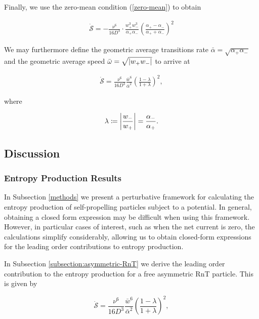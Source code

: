 Finally, we use the zero-mean condition (\ref{zero-mean}) to obtain 

\begin{align}\label{RnT-ent}
\dot{\mathcal{S}}=-\frac{\nu^6}{16D^3}\cdot\frac{w_+^3w_-^3}{\alpha_+\alpha_-}\left(\frac{\alpha_+-\alpha_-}{\alpha_+ + \alpha_-}\right)^2
\end{align}

We may furthermore define the geometric average transitions rate $\bar{\alpha}= \sqrt{\alpha_+\alpha_-}$ and the geometric average speed $\bar{\omega} = \sqrt{\abs{w_+w_-}}$ to arrive at 

\begin{align}
  \dot{\mathcal{S}} = \frac{\nu^6}{16D^3}\frac{\bar{w}^6}{\bar{\alpha}^2}\left(\frac{1-\lambda}{1+\lambda}\right)^2,
\end{align}

where 

\begin{equation}
  \lambda \coloneqq \abs{\frac{w_-}{w_+}} = \frac{\alpha_-}{\alpha_+}.
\end{equation}

\subsection{Discussion}
\subsubsection{Entropy Production Results}

In Subsection \ref{methods} we present a perturbative framework for calculating the entropy production of self-propelling particles subject to a potential. In general, obtaining a closed form expression may be difficult when using this framework. However, in particular cases of interest, such as when the net current is zero, the calculations simplify considerably, allowing us to obtain closed-form expressions for the leading order contributions to entropy production.

In Subsection \ref{subsection:asymmetric-RnT} we derive the leading order contribution to the entropy production for a free asymmetric RnT particle. This is given by

\begin{equation}\label{RnT-ent-geom}
  \dot{\mathcal{S}} = \frac{\nu^6}{16D^3}\frac{\bar{w}^6}{\bar{\alpha}^2}\left(\frac{1-\lambda}{1+\lambda}\right)^2,
\end{equation}

